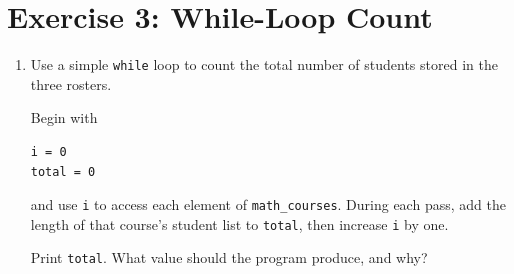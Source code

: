 \documentclass{article}
\begin{document}
\section{Exercise 3: While-Loop Count}

\begin{enumerate}
\item Use a simple \texttt{while} loop to count the total number of students stored in the three rosters.

Begin with

\begin{verbatim}
i = 0
total = 0
\end{verbatim}

and use \texttt{i} to access each element of \texttt{math\_courses}.  During each pass, add the length of that course's student list to \texttt{total}, then increase \texttt{i} by one.

Print \texttt{total}.  What value should the program produce, and why?
\end{enumerate}
\end{document}
